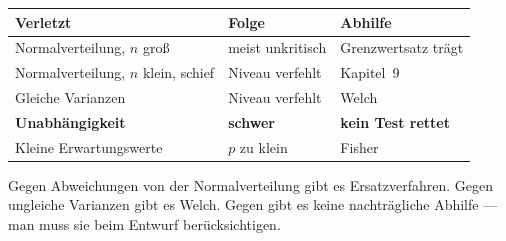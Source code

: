 \begin{merksatz}
\begin{center}
{\small
\renewcommand{\arraystretch}{1.5}
\begin{tabular}{@{}P{2.8cm}P{2.4cm}P{3.0cm}@{}}
\toprule
\textbf{Verletzt} & \textbf{Folge} & \textbf{Abhilfe}\\
\midrule
Normal\-verteilung, $n$ groß & \textcolor{gruen}{meist unkritisch} & Grenzwertsatz trägt\\
Normal\-verteilung, $n$ klein, schief & \textcolor{akzent}{Niveau verfehlt} & Kapitel~9\\
Gleiche Varianzen & \textcolor{akzent}{Niveau verfehlt} & Welch\\
\textbf{Unabhängigkeit} & \textcolor{akzent}{\textbf{schwer}} & \textcolor{akzent}{\textbf{kein Test rettet}}\\
Kleine Erwartungswerte & \textcolor{akzent}{$p$ zu klein} & Fisher\\
\bottomrule
\end{tabular}}
\end{center}

Gegen Abweichungen von der Normalverteilung gibt es Ersatzverfahren. Gegen ungleiche Varianzen gibt es Welch. Gegen  gibt es keine nachträgliche Abhilfe --- man muss sie beim Entwurf berücksichtigen.

\begin{center}
\begin{minipage}{0.88\textwidth}
\end{minipage}
\end{center}
\end{merksatz}

\begin{technik}
\begin{center}
\begin{minipage}{0.86\textwidth}
\ \ \ \ \ \ \ \ \\
\\
\\
\\
\end{minipage}
\end{center}
\end{technik}

